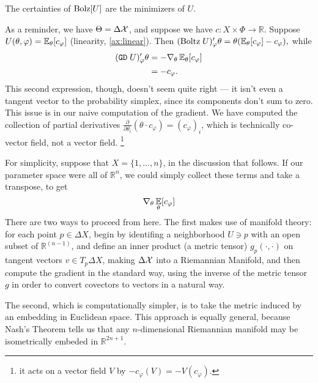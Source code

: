\documentclass{article}
\begin{document}
The certainties of $\mathrm{Bolz}[U]$ are the minimizers of $U$.



\begin{wip}
    As a reminder, we have $\Theta = \Delta \mathcal X$, and suppose we have $c : X \times \Phi \to \mathbb R$.
    Suppose $U(\theta, \varphi) = \operatorname*{\mathbb{E}}_\theta[ c_\varphi ]$ (linearity, \cref{ax:linear}).
    Then
    $%
        (\mathrm{Boltz}\;U)'_\varphi \theta = \theta(\Ex_\theta[c_\varphi] - c_\varphi),
    $%
    while
    \begin{align*}
         (\mathtt{GD}\; U)'_\varphi \theta &=
             - \nabla_{\theta} \operatorname*{\mathbb{E}}\nolimits_\theta [ c_\varphi ]
             \\ &= - c_\varphi
             .
    \end{align*}
    This second expression, though, doesn't seem quite right --- it isn't even a tangent vector to the probability simplex, since its components don't sum to zero.
    This issue is in our naive computation of the gradient.
    We have computed the collection of partial derivatives $\frac{\partial}{\partial \theta_i} ( \theta \cdot  c_\varphi) = (c_\varphi)_i$,
    which is technically  co-vector field, not a vector field.%
        \footnote{it acts on a vector field $V$ by $ -c_\varphi ( V ) = - V(c_\varphi)$.}

    For simplicity, suppose that $X = \{1, \ldots, n\}$, in the discussion that follows.
    If our parameter space were all of $\mathbb R^n$, we could simply collect these terms and take a transpose, to get
    \[
        \nabla_\theta \operatorname*{\mathbb{E}}_{\theta}[c_\varphi]
    \]
    There are two ways to proceed from here.
    The first makes use of manifold theory: for each point $p \in \Delta X$, begin by identifing a neighborhood $U \ni p$ with an open subset of $\mathbb R^{(n-1)}$, and define an inner product (a metric tensor) $g_p(\cdot, \cdot)$ on tangent vectors $v \in T_p\Delta X$, making $\Delta\mathcal X$ into a Riemannian Manifold, and then compute the gradient in the standard way, using the inverse of the metric tensor $g$ in order to convert covectors to vectors in a natural way.

    The second, which is computationally simpler, is to take the metric induced by an embedding in Euclidean space.
    This approach is equally general, because Nash's Theorem \parencite{nash1956imbedding} tells us that any $n$-dimensional Riemannian manifold may be isometrically embeded in $\mathbb R^{2n+1}$.



\end{wip}
\end{document}
